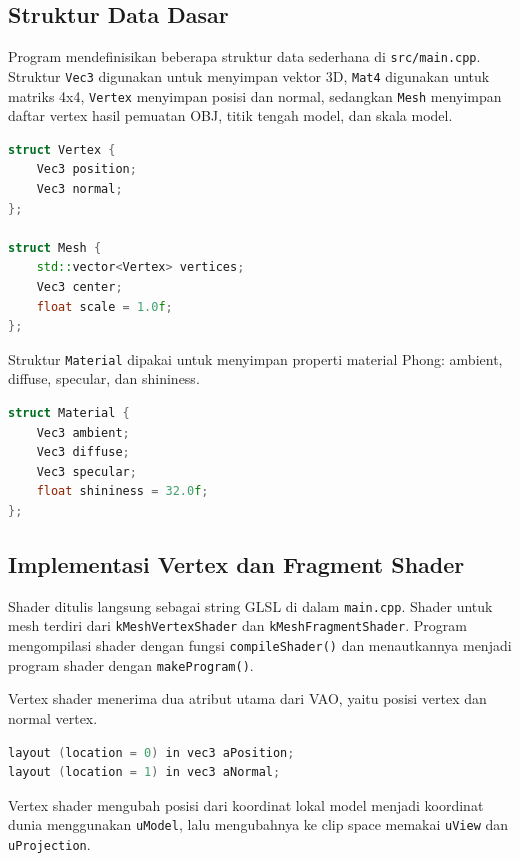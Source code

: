 \documentclass[12pt,a4paper]{article}
\begin{document}
\subsection{Struktur Data Dasar}

Program mendefinisikan beberapa struktur data sederhana di
\texttt{src/main.cpp}. Struktur \texttt{Vec3} digunakan untuk menyimpan vektor
3D, \texttt{Mat4} digunakan untuk matriks 4x4, \texttt{Vertex} menyimpan posisi
dan normal, sedangkan \texttt{Mesh} menyimpan daftar vertex hasil pemuatan OBJ,
titik tengah model, dan skala model.

\begin{lstlisting}[language=C++]
struct Vertex {
    Vec3 position;
    Vec3 normal;
};

struct Mesh {
    std::vector<Vertex> vertices;
    Vec3 center;
    float scale = 1.0f;
};
\end{lstlisting}

Struktur \texttt{Material} dipakai untuk menyimpan properti material Phong:
ambient, diffuse, specular, dan shininess.

\begin{lstlisting}[language=C++]
struct Material {
    Vec3 ambient;
    Vec3 diffuse;
    Vec3 specular;
    float shininess = 32.0f;
};
\end{lstlisting}

\subsection{Implementasi Vertex dan Fragment Shader}

Shader ditulis langsung sebagai string GLSL di dalam \texttt{main.cpp}. Shader
untuk mesh terdiri dari \texttt{kMeshVertexShader} dan
\texttt{kMeshFragmentShader}. Program mengompilasi shader dengan fungsi
\texttt{compileShader()} dan menautkannya menjadi program shader dengan
\texttt{makeProgram()}.

Vertex shader menerima dua atribut utama dari VAO, yaitu posisi vertex dan
normal vertex.

\begin{lstlisting}[language=C++]
layout (location = 0) in vec3 aPosition;
layout (location = 1) in vec3 aNormal;
\end{lstlisting}

Vertex shader mengubah posisi dari koordinat lokal model menjadi koordinat
dunia menggunakan \texttt{uModel}, lalu mengubahnya ke clip space memakai
\texttt{uView} dan \texttt{uProjection}.
\end{document}
